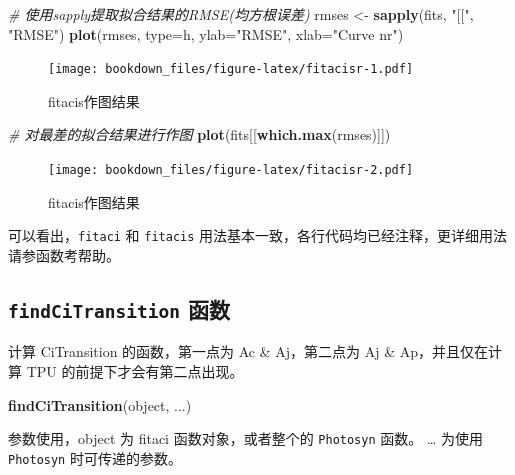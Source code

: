 \documentclass[
]{krantz}
\makeatletter
\newenvironment{Shaded}{\begin{snugshade}}{\end{snugshade}}
\newcommand{\CommentTok}[1]{\textcolor[rgb]{0.56,0.35,0.01}{\textit{#1}}}
\newcommand{\DataTypeTok}[1]{\textcolor[rgb]{0.13,0.29,0.53}{#1}}
\newcommand{\KeywordTok}[1]{\textcolor[rgb]{0.13,0.29,0.53}{\textbf{#1}}}
\newcommand{\NormalTok}[1]{#1}
\newcommand{\StringTok}[1]{\textcolor[rgb]{0.31,0.60,0.02}{#1}}
\newenvironment{kframe}{%
\medskip{}
\setlength{\fboxsep}{.8em}
 \def\at@end@of@kframe{}%
 \ifinner\ifhmode%
  \def\at@end@of@kframe{\end{minipage}}%
  \begin{minipage}{\columnwidth}%
 \fi\fi%
 \def\FrameCommand##1{\hskip\@totalleftmargin \hskip-\fboxsep
 \colorbox{shadecolor}{##1}\hskip-\fboxsep
     \hskip-\linewidth \hskip-\@totalleftmargin \hskip\columnwidth}%
 \MakeFramed {\advance\hsize-\width
   \@totalleftmargin\z@ \linewidth\hsize
   \@setminipage}}%
 {\par\unskip\endMakeFramed%
 \at@end@of@kframe}
\renewenvironment{Shaded}{\begin{kframe}}{\end{kframe}}
\makeatother
\begin{document}
\begin{Shaded}
\begin{Highlighting}[]
\CommentTok{\# 使用sapply提取拟合结果的RMSE(均方根误差)}
\NormalTok{rmses \textless{}{-}}\StringTok{ }\KeywordTok{sapply}\NormalTok{(fits, }\StringTok{"[["}\NormalTok{, }\StringTok{"RMSE"}\NormalTok{)}
\KeywordTok{plot}\NormalTok{(rmses, }\DataTypeTok{type=}\StringTok{\textquotesingle{}h\textquotesingle{}}\NormalTok{, }\DataTypeTok{ylab=}\StringTok{"RMSE"}\NormalTok{, }\DataTypeTok{xlab=}\StringTok{"Curve nr"}\NormalTok{)}
\end{Highlighting}
\end{Shaded}

\begin{figure}
\centering
\texttt{[image: bookdown\_files/figure-latex/fitacisr-1.pdf]}
\caption{\label{fig:fitacisr-1}fitacis作图结果}
\end{figure}

\begin{Shaded}
\begin{Highlighting}[]
\CommentTok{\# 对最差的拟合结果进行作图}
\KeywordTok{plot}\NormalTok{(fits[[}\KeywordTok{which.max}\NormalTok{(rmses)]])}
\end{Highlighting}
\end{Shaded}

\begin{figure}
\centering
\texttt{[image: bookdown\_files/figure-latex/fitacisr-2.pdf]}
\caption{\label{fig:fitacisr-2}fitacis作图结果}
\end{figure}

可以看出，\texttt{fitaci} 和 \texttt{fitacis} 用法基本一致，各行代码均已经注释，更详细用法请参函数考帮助。

\hypertarget{transition}{%
\subsection{\texorpdfstring{\texttt{findCiTransition} 函数}{findCiTransition 函数}}\label{transition}}

计算 CiTransition 的函数，第一点为 Ac \& Aj，第二点为 Aj \& Ap，并且仅在计算 TPU 的前提下才会有第二点出现。

\begin{Shaded}
\begin{Highlighting}[]
\KeywordTok{findCiTransition}\NormalTok{(object, ...)}
\end{Highlighting}
\end{Shaded}

参数使用，object 为 fitaci 函数对象，或者整个的 \texttt{Photosyn} 函数。
\ldots{} 为使用 \texttt{Photosyn} 时可传递的参数。
\end{document}
